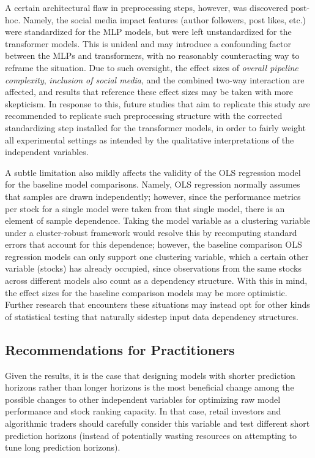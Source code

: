 \documentclass[stu,floatsintext]{apa7}
\begin{document}
A certain architectural flaw in preprocessing steps, however, was discovered post-hoc. Namely, the social media impact features (author followers, post likes, etc.) were standardized for the MLP models, but were left unstandardized for the transformer models. This is unideal and may introduce a confounding factor between the MLPs and transformers, with no reasonably counteracting way to reframe the situation. Due to such oversight, the effect sizes of \textit{overall pipeline complexity}, \textit{inclusion of social media}, and the combined two-way interaction are affected, and results that reference these effect sizes may be taken with more skepticism. In response to this, future studies that aim to replicate this study are recommended to replicate such preprocessing structure with the corrected standardizing step installed for the transformer models, in order to fairly weight all experimental settings as intended by the qualitative interpretations of the independent variables.

A subtle limitation also mildly affects the validity of the OLS regression model for the baseline model comparisons. Namely, OLS regression normally assumes that samples are drawn independently; however, since the performance metrics per stock for a single model were taken from that single model, there is an element of sample dependence. Taking the model variable as a clustering variable under a cluster-robust framework would resolve this by recomputing standard errors that account for this dependence; however, the baseline comparison OLS regression models can only support one clustering variable, which a certain other variable (stocks) has already occupied, since observations from the same stocks across different models also count as a dependency structure. With this in mind, the effect sizes for the baseline comparison models may be more optimistic. Further research that encounters these situations may instead opt for other kinds of statistical testing that naturally sidestep input data dependency structures.

\subsection{Recommendations for Practitioners}

Given the results, it is the case that designing models with shorter prediction horizons rather than longer horizons is the most beneficial change among the possible changes to other independent variables for optimizing raw model performance and stock ranking capacity. In that case, retail investors and algorithmic traders should carefully consider this variable and test different short prediction horizons (instead of potentially wasting resources on attempting to tune long prediction horizons).
\end{document}
